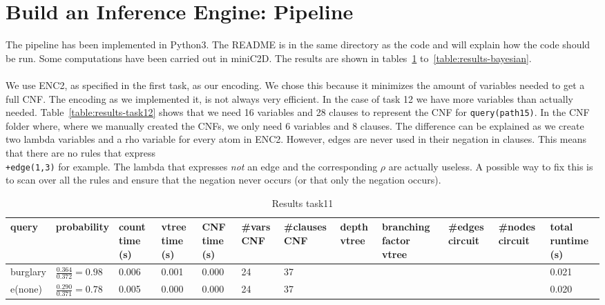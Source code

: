 \section{Build an Inference Engine: Pipeline}

The pipeline has been implemented in Python3. The README is in the same directory as the code and will explain how the code should be run. Some computations have been carried out in miniC2D. The results are shown in tables~\ref{table:results-task11} to~\ref{table:results-bayesian}.
\\\\
We use ENC2, as specified in the first task, as our encoding. We chose this because it minimizes the amount of variables needed to get a full CNF. The encoding as we implemented it, is not always very efficient. In the case of task 12 we have more variables than actually needed. Table~\ref{table:results-task12} shows that we need 16 variables and 28 clauses to represent the CNF for \texttt{query(path15)}. In the CNF folder where, where we manually created the CNFs, we only need 6 variables and 8 clauses. The difference can be explained as we create two lambda variables and a rho variable for every atom in ENC2. However, edges are never used in their negation in clauses. This means that there are no rules that express \texttt{\\+edge(1,3)} for example. The lambda that expresses \textit{not} an edge and the corresponding $\rho$ are actually useless. A possible way to fix this is to scan over all the rules and ensure that the negation never occurs (or that only the negation occurs).

\begin{table}[h]
\centering
\caption{Results task11}
\label{table:results-task11}
\begin{tabular}{l|l|l|l|l|l|l|l|l|l|l|l}
\textbf{query} & \textbf{probability} & \textbf{count time (s)} & \textbf{vtree time (s)} & \textbf{CNF time (s)} & \textbf{\#vars CNF} & \textbf{\#clauses CNF} & \textbf{depth vtree} & \textbf{branching factor vtree} & \textbf{\#edges circuit} & \textbf{\#nodes circuit} & \textbf{total runtime (s)} \\ \hline
burglary &  $\frac{0.364}{0.372} = 0.98$ & 0.006 & 0.001  &  0.000 &  24 & 37 &   &  &  &  &  0.021 \\
e(none) & $\frac{0.290}{0.371} = 0.78$  & 0.005 & 0.000 &  0.000 & 24 & 37 &  &    &   &  & 0.020
\end{tabular}
\end{table}

